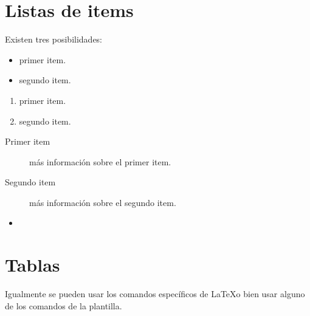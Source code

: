 


\section{Listas de items}

Existen tres posibilidades:

\begin{itemize}
	\item primer item.
	\item segundo item.
\end{itemize}

\begin{enumerate}
	\item primer item.
	\item segundo item.
\end{enumerate}

\begin{description}
	\item[Primer item] más información sobre el primer item.
	\item[Segundo item] más información sobre el segundo item.
\end{description}
	
\begin{itemize}
\item 
\end{itemize}

\section{Tablas}

Igualmente se pueden usar los comandos específicos de \LaTeX o bien usar alguno de los comandos de la plantilla.

